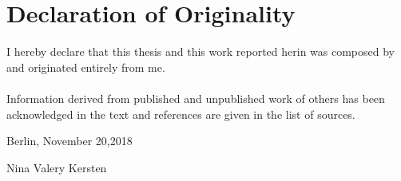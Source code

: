 \newpage
\thispagestyle{empty}

\section*{Declaration of Originality}

\vspace*{2cm}

\noindent
I hereby declare that this thesis and this work reported herin was composed by and originated entirely from me. 
\\\\
Information derived from published and unpublished work of others has been acknowledged in the text and references are given in the list of sources.

\vspace{2cm}

\noindent
Berlin, November 20,2018
\vspace{2cm}

Nina Valery Kersten


